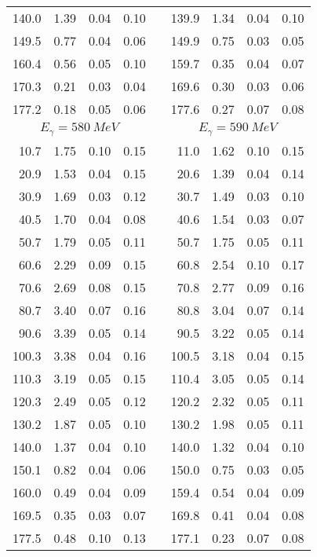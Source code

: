 \begin{table}[htbp]
\begin{center}
\begin{tabular}{|r|r|c|c|l|r|r|c|c|}
140.0 &  1.39 &  0.04 &  0.10 & & 139.9 &  1.34 &  0.04 &  0.10 \\ 
149.5 &  0.77 &  0.04 &  0.06 & & 149.9 &  0.75 &  0.03 &  0.05 \\ 
160.4 &  0.56 &  0.05 &  0.10 & & 159.7 &  0.35 &  0.04 &  0.07 \\ 
170.3 &  0.21 &  0.03 &  0.04 & & 169.6 &  0.30 &  0.03 &  0.06 \\ 
177.2 &  0.18 &  0.05 &  0.06 & & 177.6 &  0.27 &  0.07 &  0.08 \\ 
\hline 
\hline 
\multicolumn{4}{|c|}{ $E_{\gamma}=580~MeV$} & & 
\multicolumn{4}{c|}{ $E_{\gamma}=590~MeV$} \\ 
\cline{1-4} 
\cline{6-9} 
 10.7 &  1.75 &  0.10 &  0.15 & &  11.0 &  1.62 &  0.10 &  0.15 \\ 
 20.9 &  1.53 &  0.04 &  0.15 & &  20.6 &  1.39 &  0.04 &  0.14 \\ 
 30.9 &  1.69 &  0.03 &  0.12 & &  30.7 &  1.49 &  0.03 &  0.10 \\ 
 40.5 &  1.70 &  0.04 &  0.08 & &  40.6 &  1.54 &  0.03 &  0.07 \\ 
 50.7 &  1.79 &  0.05 &  0.11 & &  50.7 &  1.75 &  0.05 &  0.11 \\ 
 60.6 &  2.29 &  0.09 &  0.15 & &  60.8 &  2.54 &  0.10 &  0.17 \\ 
 70.6 &  2.69 &  0.08 &  0.15 & &  70.8 &  2.77 &  0.09 &  0.16 \\ 
 80.7 &  3.40 &  0.07 &  0.16 & &  80.8 &  3.04 &  0.07 &  0.14 \\ 
 90.6 &  3.39 &  0.05 &  0.14 & &  90.5 &  3.22 &  0.05 &  0.14 \\ 
100.3 &  3.38 &  0.04 &  0.16 & & 100.5 &  3.18 &  0.04 &  0.15 \\ 
110.3 &  3.19 &  0.05 &  0.15 & & 110.4 &  3.05 &  0.05 &  0.14 \\ 
120.3 &  2.49 &  0.05 &  0.12 & & 120.2 &  2.32 &  0.05 &  0.11 \\ 
130.2 &  1.87 &  0.05 &  0.10 & & 130.2 &  1.98 &  0.05 &  0.11 \\ 
140.0 &  1.37 &  0.04 &  0.10 & & 140.0 &  1.32 &  0.04 &  0.10 \\ 
150.1 &  0.82 &  0.04 &  0.06 & & 150.0 &  0.75 &  0.03 &  0.05 \\ 
160.0 &  0.49 &  0.04 &  0.09 & & 159.4 &  0.54 &  0.04 &  0.09 \\ 
169.5 &  0.35 &  0.03 &  0.07 & & 169.8 &  0.41 &  0.04 &  0.08 \\ 
177.5 &  0.48 &  0.10 &  0.13 & & 177.1 &  0.23 &  0.07 &  0.08 \\ 
\cline{1-4} 
\cline{6-9} 
\end{tabular} 

\end{center} 
\end{table}

